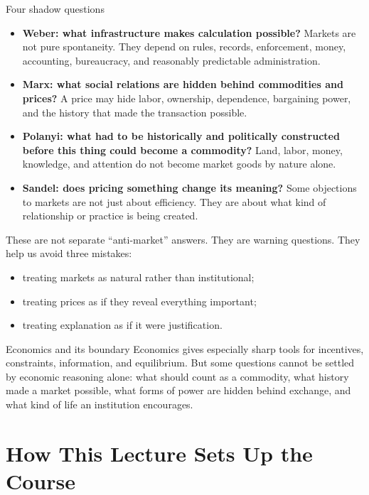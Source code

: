 \documentclass[10pt,a4paper]{article}
\begin{document}
\begin{keybox}{Four shadow questions}
\begin{itemize}
  \item \textbf{Weber: what infrastructure makes calculation possible?} Markets are not pure spontaneity. They depend on rules, records, enforcement, money, accounting, bureaucracy, and reasonably predictable administration.
  \item \textbf{Marx: what social relations are hidden behind commodities and prices?} A price may hide labor, ownership, dependence, bargaining power, and the history that made the transaction possible.
  \item \textbf{Polanyi: what had to be historically and politically constructed before this thing could become a commodity?} Land, labor, money, knowledge, and attention do not become market goods by nature alone.
  \item \textbf{Sandel: does pricing something change its meaning?} Some objections to markets are not just about efficiency. They are about what kind of relationship or practice is being created.
\end{itemize}
\end{keybox}

These are not separate ``anti-market'' answers. They are warning questions. They help us avoid three mistakes:

\begin{itemize}
  \item treating markets as natural rather than institutional;
  \item treating prices as if they reveal everything important;
  \item treating explanation as if it were justification.
\end{itemize}

\begin{insightbox}{Economics and its boundary}
Economics gives especially sharp tools for incentives, constraints, information, and equilibrium. But some questions cannot be settled by economic reasoning alone: what should count as a commodity, what history made a market possible, what forms of power are hidden behind exchange, and what kind of life an institution encourages.
\end{insightbox}

\section{How This Lecture Sets Up the Course}
\end{document}
